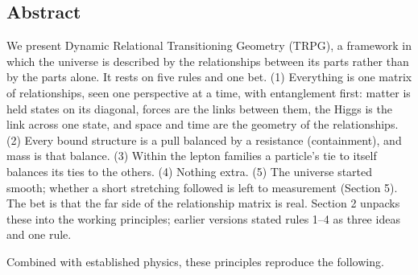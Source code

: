 \documentclass[
  11pt,
]{article}
\begin{document}
\hypertarget{abstract}{%
\subsection{Abstract}\label{abstract}}

We present Dynamic Relational Transitioning Geometry (TRPG), a framework in which the universe is described by the relationships between its parts rather than by the parts alone. It rests on five rules and one bet. (1) Everything is one matrix of relationships, seen one perspective at a time, with entanglement first: matter is held states on its diagonal, forces are the links between them, the Higgs is the link across one state, and space and time are the geometry of the relationships. (2) Every bound structure is a pull balanced by a resistance (containment), and mass is that balance. (3) Within the lepton families a particle's tie to itself balances its ties to the others. (4) Nothing extra. (5) The universe started smooth; whether a short stretching followed is left to measurement (Section 5). The bet is that the far side of the relationship matrix is real. Section 2 unpacks these into the working principles; earlier versions stated rules 1--4 as three ideas and one rule.

Combined with established physics, these principles reproduce the following.
\end{document}
